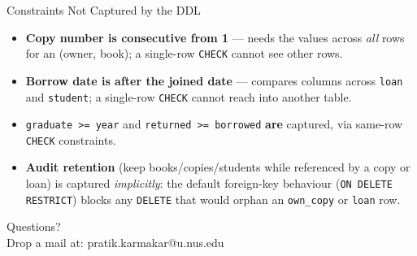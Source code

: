 \documentclass{beamer}
\begin{document}
\begin{frame}{Constraints Not Captured by the DDL}
\small
\begin{itemize}
  \item \textbf{Copy number is consecutive from 1} --- needs the values across \emph{all} rows for an (owner, book); a single-row \texttt{CHECK} cannot see other rows.
  \item \textbf{Borrow date is after the joined date} --- compares columns across \texttt{loan} and \texttt{student}; a single-row \texttt{CHECK} cannot reach into another table.
  \item \texttt{graduate >= year} and \texttt{returned >= borrowed} \textbf{are} captured, via same-row \texttt{CHECK} constraints.
  \item \textbf{Audit retention} (keep books/copies/students while referenced by a copy or loan) is captured \emph{implicitly}: the default foreign-key behaviour (\texttt{ON DELETE RESTRICT}) blocks any \texttt{DELETE} that would orphan an \texttt{own\_copy} or \texttt{loan} row.
\end{itemize}
\end{frame}

\begin{frame}
\begin{center}
Questions?\\
Drop a mail at: pratik.karmakar@u.nus.edu
\end{center}
\end{frame}
\end{document}

